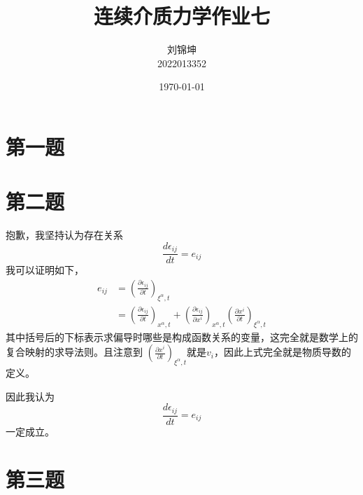 \documentclass[UTF8]{ctexart}
\title{连续介质力学作业七}
\author{刘锦坤\\2022013352}
\date{\today}
\begin{document}
\maketitle

\section{第一题}

\section{第二题}
抱歉，我坚持认为存在关系
\begin{equation*}
    \frac{d \epsilon_{ij}}{dt}=e_{ij}  
\end{equation*}
我可以证明如下，
\begin{align*}
    e_{ij}&=(\frac{\partial \epsilon_{ij}}{\partial t})_{\xi^\alpha,t}\\
    &=(\frac{\partial \epsilon_{ij}}{\partial t})_{x^\alpha,t}
    +(\frac{\partial \epsilon_{ij}}{\partial x^i})_{x^\alpha,t}(\frac{\partial x^i}{\partial t})_{\xi^\alpha,t}
\end{align*}
其中括号后的下标表示求偏导时哪些是构成函数关系的变量，这完全就是数学上的复合映射的求导法则。且注意到
$(\frac{\partial x^i}{\partial t})_{\xi^\alpha,t}$就是$v_i$，因此上式完全就是物质导数的定义。

因此我认为
\begin{equation*}
    \frac{d \epsilon_{ij}}{dt}=e_{ij}  
\end{equation*}
一定成立。

\section{第三题}
\end{document}
